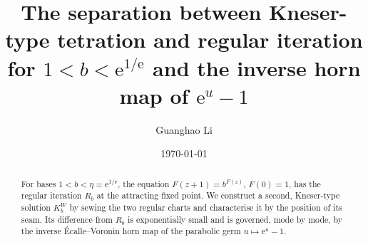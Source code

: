 \documentclass[11pt]{amsart}
\theoremstyle{definition}
\newcommand{\Rr}{R}
\newcommand{\Kk}{K}
\newcommand{\eee}{\mathrm{e}}
\begin{document}
\title[Kneser-type tetration, regular iteration, and the horn map of $\eee^u-1$]{The separation between Kneser-type tetration and regular iteration for $1<b<\eee^{1/\eee}$ and the inverse horn map of $\eee^u-1$}

\author{Guanghao Li}

\date{\today}

\begin{abstract}
For bases $1<b<\eta=\eee^{1/\eee}$, the equation $F(z+1)=b^{F(z)}$,
$F(0)=1$, has the regular iteration $\Rr_b$ at the attracting fixed point.
We construct a second, Kneser-type solution $\Kk^W_b$ by sewing the two
regular charts and characterise it by the position of its seam.  Its
difference from $\Rr_b$ is exponentially small and is governed, mode by
mode, by the inverse \'Ecalle--Voronin horn map of the parabolic germ
$u\mapsto\eee^u-1$.


\end{abstract}
\end{document}
